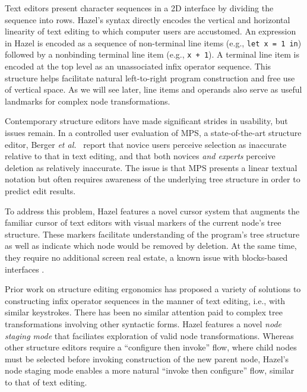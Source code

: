 \documentclass[format=sigplan,dvipsnames,backend=bibtex]{acmart}
\newcommand{\Hazel}{\textsf{Hazel}\xspace}
\begin{document}
Text editors present character sequences in a 2D interface by dividing the
	sequence into rows.
\Hazel's syntax directly encodes the vertical and horizontal linearity of text
	editing to which computer users are accustomed.
An expression in \Hazel is encoded as a sequence of non-terminal line items
	(e.g., \texttt{let x = 1 in}) followed by a nonbinding terminal line item
	(e.g., \texttt{x + 1}). 
A terminal line item is encoded at the top level as an unassociated infix operator sequence.
This structure helps facilitate natural left-to-right program construction and free use of
	vertical space.
As we will see later, line items and operands also serve as useful landmarks for complex
	node transformations.

Contemporary structure editors have made significant strides in usability, but
	issues remain.
In a controlled user evaluation of MPS, a state-of-the-art structure editor,
	Berger \emph{et al.}~ \cite{ProjEfficiency}
	report that novice users perceive selection as inaccurate relative to that in text
	editing, and that both novices \emph{and experts} perceive deletion as relatively inaccurate.
The issue is that MPS presents a linear textual notation but often requires awareness of the 
	underlying tree structure in order to predict edit results.

To address this problem, \Hazel features a novel cursor system that augments the familiar
	cursor of text editors with visual markers of the current node's tree structure.
These markers facilitate understanding of the program's tree structure as well as indicate
	which node would be removed by deletion.
At the same time, they require no additional screen real estate, a known issue with
	blocks-based interfaces \cite{BlocksFingertips}.

Prior work on structure editing ergonomics has proposed a variety of solutions to 
	constructing infix operator sequences in the manner of text editing, i.e., with similar 
	keystrokes.
There has been no similar attention paid to complex tree transformations involving other 
	syntactic forms.
\Hazel features a novel \emph{node staging mode} that faciliates exploration of valid
	node transformations.
Whereas other structure editors require a ``configure then invoke'' flow, where child
	nodes must be selected before invoking construction of the new parent node, \Hazel's
	node staging mode enables a more natural ``invoke then configure'' flow, similar to
	that of text editing.
\end{document}

